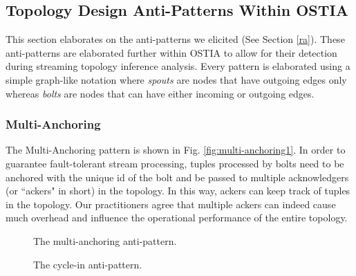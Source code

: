 \documentclass[smallextended]{svjour3}       %
\newcommand{\todoMB}[2]{\linespread{0.7}\todo[color=yellow!50,#1]{\scriptsize\textbf{MB:}#2}}
\begin{document}
\subsection{Topology Design Anti-Patterns Within OSTIA}\label{sec:anti-pattern}
This section elaborates on the anti-patterns we elicited (See Section \ref{ra}). These anti-patterns are elaborated further within OSTIA to allow for their detection during streaming topology inference analysis. Every pattern is elaborated using a simple graph-like notation where \emph{spouts} are nodes that have outgoing edges only whereas \emph{bolts} are nodes that can have either incoming or outgoing edges.

\subsubsection{Multi-Anchoring}
The Multi-Anchoring pattern is shown in Fig. \ref{fig:multi-anchoring1}. In order to guarantee fault-tolerant stream processing, tuples processed by bolts need to be anchored with the unique {\sf id} of the bolt and be passed to multiple acknowledgers (or ``ackers" in short) in the topology. In this way, ackers can keep track of tuples in the topology. Our practitioners agree that multiple ackers can indeed cause much overhead and influence the operational performance of the entire topology.


\begin{figure}
\centering 
{}\caption{The multi-anchoring anti-pattern.}\label{fig:multi-anchoring1}
\caption{The cycle-in anti-pattern.}\label{fig:cycle1}
\end{figure}
\end{document}
